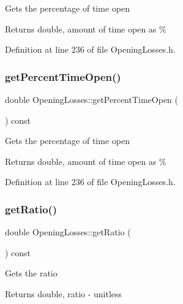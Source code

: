 Gets the percentage of time open \begin{DoxyReturn}{Returns}
double, amount of time open as \% 
\end{DoxyReturn}


Definition at line 236 of file Opening\+Losses.\+h.

\mbox{\label{class_opening_losses_aeefc3790a569008ff2e804033a9efea3}} 
\subsubsection{\texorpdfstring{get\+Percent\+Time\+Open()}{getPercentTimeOpen()}\hspace{0.1cm}{\footnotesize\ttfamily [3/3]}}
{\footnotesize\ttfamily double Opening\+Losses\+::get\+Percent\+Time\+Open (\begin{DoxyParamCaption}{ }\end{DoxyParamCaption}) const\hspace{0.3cm}{\ttfamily [inline]}}

Gets the percentage of time open \begin{DoxyReturn}{Returns}
double, amount of time open as \% 
\end{DoxyReturn}


Definition at line 236 of file Opening\+Losses.\+h.

\mbox{\label{class_opening_losses_ac9f7dbd2cc023932b5d8076a21a3f690}} 
\subsubsection{\texorpdfstring{get\+Ratio()}{getRatio()}\hspace{0.1cm}{\footnotesize\ttfamily [1/3]}}
{\footnotesize\ttfamily double Opening\+Losses\+::get\+Ratio (\begin{DoxyParamCaption}{ }\end{DoxyParamCaption}) const\hspace{0.3cm}{\ttfamily [inline]}}

Gets the ratio \begin{DoxyReturn}{Returns}
double, ratio -\/ unitless 
\end{DoxyReturn}



